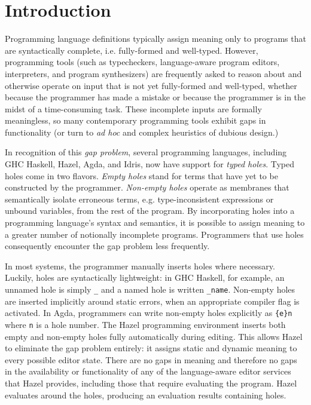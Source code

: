 \section{Introduction}
\label{sec:intro}

Programming language definitions typically assign meaning 
only to programs that are syntactically complete, i.e. fully-formed and well-typed.
However, programming tools (such as typecheckers, language-aware program editors, interpreters, and program synthesizers) 
are frequently asked to reason about and otherwise operate on input that is not yet fully-formed and well-typed,
whether because the programmer has made a mistake or because the programmer is in the midst of a time-consuming task. 
These incomplete inputs are formally meaningless, so many contemporary programming tools exhibit gaps in functionality (or turn to  
\emph{ad hoc} and complex heuristics of dubious design.)

In recognition of this \emph{gap problem}, several programming languages, 
including GHC Haskell, Hazel, Agda, and Idris, now 
have support for \emph{typed holes}. Typed holes come in two flavors. \emph{Empty holes} 
stand for terms that have yet to be constructed by the programmer. 
\emph{Non-empty holes} 
operate as membranes that semantically isolate erroneous terms, e.g. type-inconsistent
expressions or unbound variables, 
from the rest of the program.
By incorporating holes into a programming language's syntax and semantics, 
it is possible to assign meaning to a greater number of notionally incomplete programs.
Programmers that use holes consequently encounter the gap problem less frequently.

In most systems, the programmer manually inserts holes where necessary.
Luckily, holes are syntactically lightweight: in GHC Haskell, for example, an unnamed
hole is simply \verb|_| and a named hole is written \verb|_name|. 
Non-empty holes are inserted implicitly around static errors, when an appropriate compiler flag
is activated. In Agda, programmers can write 
non-empty holes explicitly as \verb|{e}n| where \lstinline{n} is a hole number.
The Hazel programming environment inserts both empty and non-empty holes fully automatically during editing. This allows Hazel to eliminate the gap problem entirely: it assigns static and dynamic meaning to every possible
editor state. There are no gaps in meaning and therefore no gaps in the availability or functionality of any of the 
language-aware editor services that Hazel provides, including those that require evaluating the program. Hazel evaluates around the holes, producing an evaluation results containing holes.

